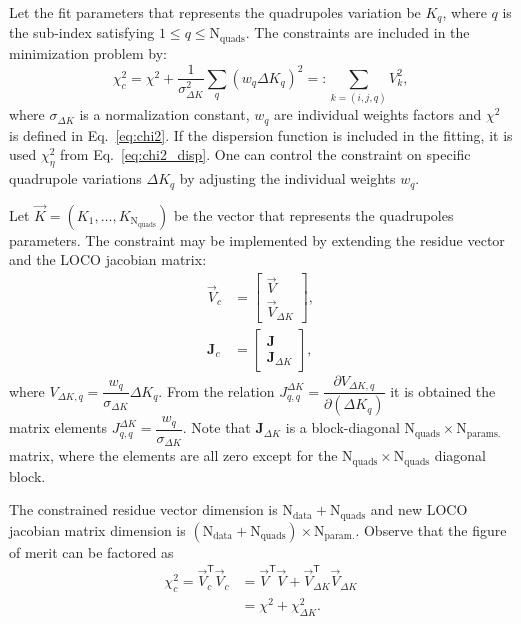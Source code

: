 Let the fit parameters that represents the quadrupoles variation be $K_{q}$, where $q$ is the sub-index satisfying $1 \leq q \leq \mathrm{N}_{\mathrm{quads}}$. The constraints are included in the minimization problem by:
\begin{equation}
    \chi^2_{c} = \chi^2 + \dfrac{1}{\sigma_{\Delta K}^2}\sum_q \left(w_q \Delta K_q\right)^2 =: \sum_{{k = (i,j, q)}} V_{k}^2,
    \label{eq:chi2_constraint}
\end{equation}
where $\sigma_{\Delta K}$ is a normalization constant, $w_q$ are individual weights factors and $\chi^2$ is defined in Eq.~\eqref{eq:chi2}. If the dispersion function is included in the fitting, it is used $\chi^2_{\eta}$ from Eq.~\eqref{eq:chi2_disp}. One can control the constraint on specific quadrupole variations $\Delta K_q$ by adjusting the individual weights $w_q$.

Let $\vec{K} = \left(K_1, \ldots, K_{\mathrm{N}_{\mathrm{quads}}}\right)$ be the vector that represents the quadrupoles parameters. The constraint may be implemented by extending the residue vector and the LOCO jacobian matrix:
\begin{align}
    \vec{V}_c &= \begin{bmatrix}
    \vec{V} \\
    \vec{V}_{\Delta K}
    \end{bmatrix}, \\
    \mathbf{J}_c &= 
    \begin{bmatrix}
    \mathbf{J} \\
    \mathbf{J}_{\Delta K}
    \end{bmatrix},
\end{align}
where $V_{\Delta K, q} = \dfrac{w_q}{\sigma_{\Delta K}}\Delta K_q$. From the relation $J_{q, q}^{\Delta K} = \dfrac{\partial V_{\Delta K, q}}{\partial \left(\Delta K_q\right)}$ it is obtained the matrix elements $J_{q, q}^{\Delta K} = \dfrac{w_q}{\sigma_{\Delta K}}$. Note that $\mathbf{J}_{\Delta K}$ is a block-diagonal $\mathrm{N}_{\mathrm{quads}} \times \mathrm{N}_{\mathrm{params.}}$ matrix, where the elements are all zero except for the $\mathrm{N}_{\mathrm{quads}} \times \mathrm{N}_{\mathrm{quads}}$ diagonal block.

The constrained residue vector dimension is $\mathrm{N}_{\mathrm{data}} + \mathrm{N}_{\mathrm{quads}}$ and new LOCO jacobian matrix dimension is $\left(\mathrm{N}_{\mathrm{data}} + \mathrm{N}_{\mathrm{quads}}\right) \times \mathrm{N}_{\mathrm{param.}}$. Observe that the figure of merit can be factored as
\begin{align*}
    \chi_c^2 = \vec{V}_c^{\mathsf{T}}\vec{V}_c &= \vec{V}^{\mathsf{T}}\vec{V} + \vec{V}_{\Delta K}^{\mathsf{T}}\vec{V}_{\Delta K} \\ 
    &= \chi^2 + \chi^2_{\Delta K}.
\end{align*}

